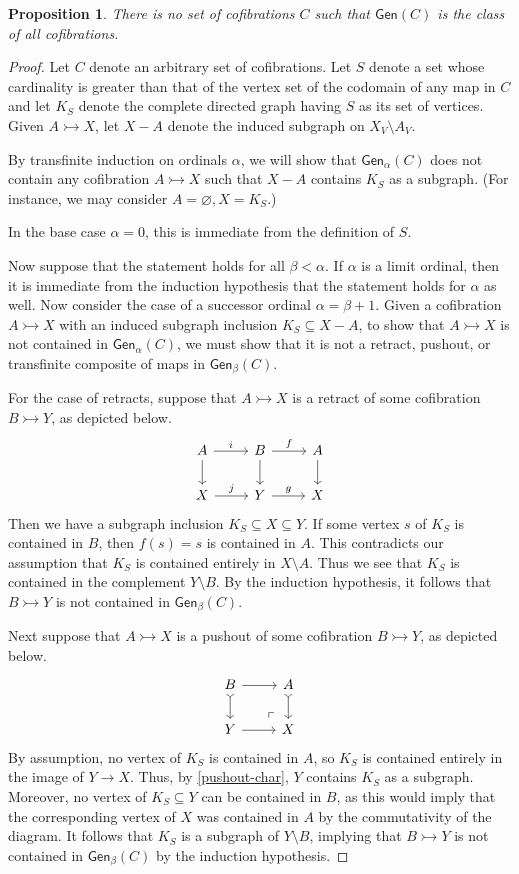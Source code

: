 \documentclass[11pt]{article}
\newtheorem{proposition}[theo]{Proposition}
\theoremstyle{definition}
\numberwithin{equation}{section}
\newcommand{\Gen}{\mathsf{Gen}}
\newcommand{\pushout}{\arrow [dr, phantom, "\ulcorner" very near end]}
\newcommand{\cto}{\rightarrowtail}
\begin{document}
\begin{proposition}\label{no-gen-cof-set}
There is no set of cofibrations $C$ such that $\Gen(C)$ is the class of all cofibrations.
\end{proposition}

\begin{proof}
Let $C$ denote an arbitrary set of cofibrations. Let  $S$ denote a set whose cardinality is greater than that of the vertex set of the codomain of any map in $C$ and let $K_S$ denote the complete directed graph having $S$ as its set of vertices. Given $A \cto X$, let $X - A$ denote the induced subgraph on $X_V\setminus A_V.$

By transfinite induction on ordinals $\alpha$, we will show that $\Gen_\alpha(C)$ does not contain any cofibration $A \cto X$ such that $X - A$ contains $K_S$ as a subgraph. (For instance, we may consider $A = \varnothing, X = K_S$.) 

In the base case $\alpha = 0$, this is immediate from the definition of $S$.

Now suppose that the statement holds for all $\beta < \alpha$. If $\alpha$ is a limit ordinal, then it is immediate from the induction hypothesis that the statement holds for $\alpha$ as well. Now consider the case of a successor ordinal $\alpha = \beta + 1$. Given a cofibration $A \cto X$ with an induced subgraph inclusion $K_S \subseteq X-A$, to show that $A \cto X$ is not contained in $\Gen_\alpha(C)$, we must show that it is not a retract, pushout, or transfinite composite of maps in $\Gen_\beta(C)$.

For the case of retracts, suppose that $A \cto X$ is a retract of some cofibration $B \cto Y$, as depicted below.
\[
\begin{tikzcd}
A \arrow[d] \arrow[r,"i",above] & B \arrow[d] \arrow[r,"f",above] & A \arrow[d] \\
X \arrow[r,"j",above] & Y \arrow[r,"g",above] & X
\end{tikzcd}
\]
Then we have a subgraph inclusion $K_S \subseteq X \subseteq Y$. If some vertex $s$ of $K_S$ is contained in $B$, then $f(s) = s$ is contained in $A$. This contradicts our assumption that $K_S$ is contained entirely in $X \setminus A$. Thus we see that $K_S$ is contained in the complement $Y \setminus B$. By the induction hypothesis, it follows that $B \cto Y$ is not contained in $\Gen_\beta(C)$.

Next suppose that $A \cto X$ is a pushout of some cofibration $B \cto Y$, as depicted below.
\[
\begin{tikzcd}
B \arrow[r] \arrow[d,tail] \pushout & A \arrow[d,tail] \\
Y \arrow[r] & X
\end{tikzcd}
\]
By assumption, no vertex of $K_S$ is contained in $A$, so $K_S$ is contained entirely in the image of $Y \to X$. Thus, by \cref{pushout-char}, $Y$ contains $K_S$ as a subgraph. Moreover, no vertex of $K_S \subseteq Y$ can be contained in $B$, as this would imply that the corresponding vertex of $X$ was contained in $A$ by the commutativity of the diagram. It follows that $K_S$ is a subgraph of $Y \setminus B$, implying that $B \cto Y$ is not contained in $\Gen_\beta(C)$ by the induction hypothesis.


\end{proof}
\end{document}
